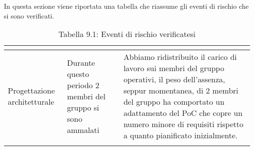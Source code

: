 In questa sezione viene riportata una tabella che riassume gli eventi di rischio che si sono verificati.
\\
\renewcommand{\arraystretch}{1.5}
\begin{longtable}{| m{13em} | m{11em} | m{14em} |}
\hline
\rowcolor{title_row}
\textbf{\color{title_text}{Periodo}}  & \textbf{\color{title_text}{Evento}} & \textbf{\color{title_text}{Reazione}} \\
\endhead
\hline
Progettazione architetturale & Durante questo periodo 2 membri del gruppo si sono ammalati & Abbiamo ridistribuito il carico di lavoro sui membri del gruppo operativi,
il peso dell'assenza, seppur momentanea, di 2 membri del gruppo ha comportato un adattamento del PoC che copre un numero minore di requisiti rispetto a quanto pianificato inizialmente. \\
\hline
\caption{Tabella 9.1: Eventi di rischio verificatesi\label{}}
\end{longtable}
\renewcommand{\arraystretch}{1}
\newpage
